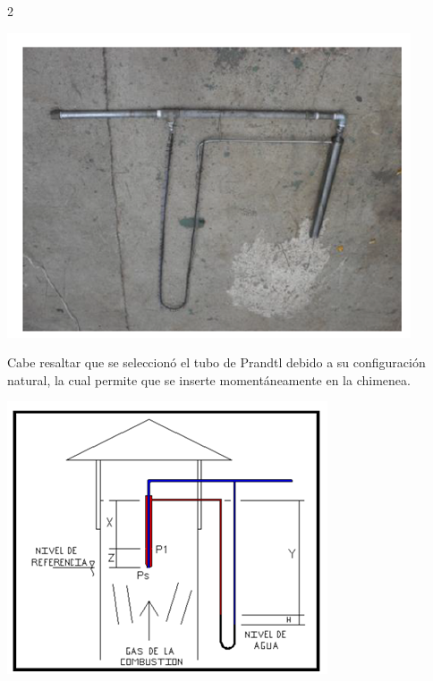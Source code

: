 \documentclass[12pt,spanish,Letterpaper,openany]{book}
\begin{document}
\begin {multicols}{2}
\begin {flushleft}
\noindent\begin{minipage}[c]{\columnwidth}

\centering

\includegraphics[width=1\linewidth]{images/image05_wvaliente}

\end{minipage}

\end {flushleft}

Cabe resaltar que se seleccionó el tubo de Prandtl debido a su configuración natural, la cual permite que se inserte momentáneamente en la chimenea.

\begin {flushleft}
\noindent\begin{minipage}[c]{\columnwidth}

\centering

\includegraphics[width=1\linewidth]{images/image06_wvaliente}


\end{minipage}
\end{flushleft}
\end{multicols}
\end{document}
